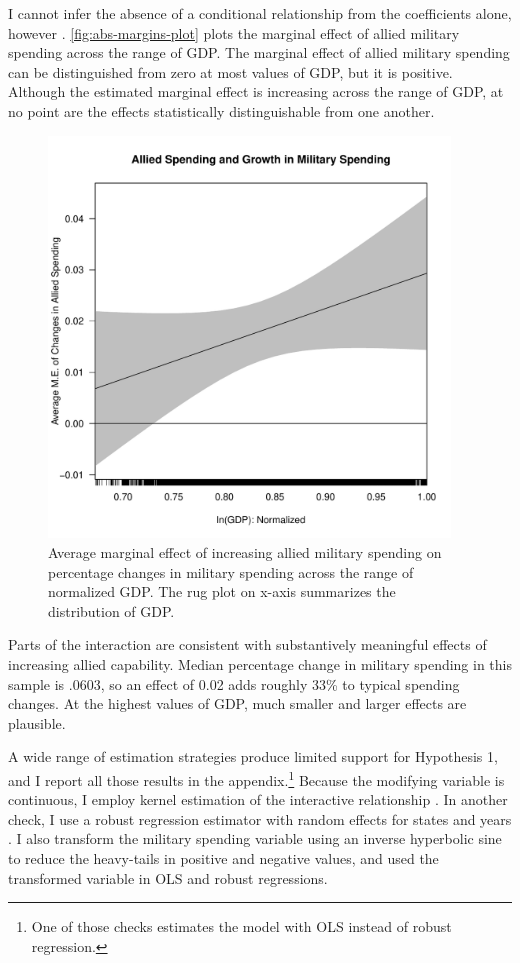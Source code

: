 \documentclass[12pt]{article}
\begin{document}
I cannot infer the absence of a conditional relationship from the coefficients alone, however \citep{BramborClarkGolder2006}. 
\autoref{fig:abs-margins-plot} plots the marginal effect of allied military spending across the range of GDP. 
The marginal effect of allied military spending can be distinguished from zero at most values of GDP, but it is positive. 
Although the estimated marginal effect is increasing across the range of GDP, at no point are the effects statistically distinguishable from one another. 


\begin{figure}
	\centering
		\includegraphics[width=0.95\textwidth]{abs-margins-plot.pdf}
	\caption{Average marginal effect of increasing allied military spending on percentage changes in military spending across the range of normalized GDP. The rug plot on x-axis summarizes the distribution of GDP.}
		\label{fig:abs-margins-plot}
\end{figure}


Parts of the interaction are consistent with substantively meaningful effects of increasing allied capability. 
Median percentage change in military spending in this sample is .0603, so an effect of 0.02 adds roughly 33\% to typical spending changes. 
At the highest values of GDP, much smaller and larger effects are plausible. 


A wide range of estimation strategies produce limited support for Hypothesis 1, and I report all those results in the appendix.\footnote{One of those checks estimates the model with OLS instead of robust regression.}
Because the modifying variable is continuous, I employ kernel estimation of the interactive relationship \citep{Hainmuelleretal2019}.
In another check, I use a robust regression estimator with random effects for states and years \citep{Koller2016}. 
I also transform the military spending variable using an inverse hyperbolic sine to reduce the heavy-tails in positive and negative values, and used the transformed variable in OLS and robust regressions. 
\end{document}
